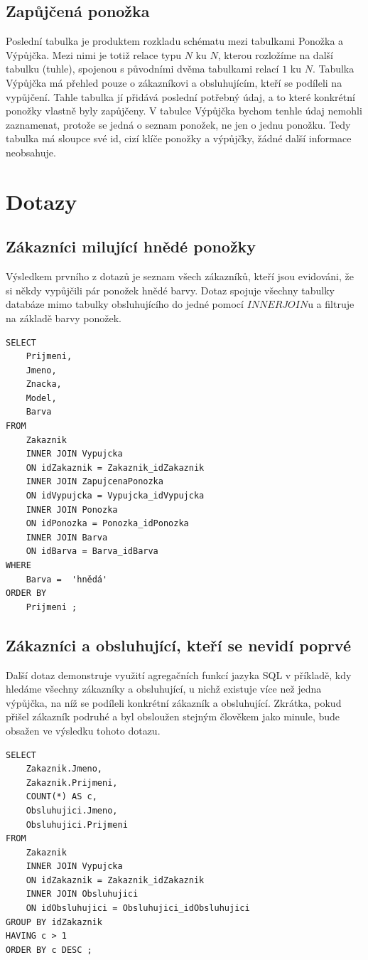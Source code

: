 \documentclass[titlepage]{article}
\begin{document}
\subsection{Zapůjčená ponožka}
Poslední tabulka je produktem rozkladu schématu mezi tabulkami Ponožka a
Výpůjčka. Mezi nimi je totiž relace typu $N$ ku $N$, kterou rozložíme na další
tabulku (tuhle), spojenou s původními dvěma tabulkami relací $1$ ku $N$.
Tabulka Výpůjčka má přehled pouze o zákazníkovi a obsluhujícím, kteří se
podíleli na vypůjčení. Tahle tabulka jí přidává poslední potřebný údaj, a to
které konkrétní ponožky vlastně byly zapůjčeny. V tabulce Výpůjčka bychom
tenhle údaj nemohli zaznamenat, protože se jedná o seznam ponožek, ne jen o
jednu ponožku. Tedy tabulka má sloupce své id, cizí klíče ponožky a výpůjčky,
žádné další informace neobsahuje.

\section{Dotazy}
\subsection{Zákazníci milující hnědé ponožky}
Výsledkem prvního z dotazů je seznam všech zákazníků, kteří jsou evidováni, že
si někdy vypůjčili pár ponožek hnědé barvy. Dotaz spojuje všechny tabulky
databáze mimo tabulky obsluhujícího do jedné pomocí $INNER JOIN$u a filtruje na
základě barvy ponožek.
\begin{verbatim}
SELECT 
	Prijmeni, 
	Jmeno, 
	Znacka, 
	Model, 
	Barva
FROM 
	Zakaznik
	INNER JOIN Vypujcka
	ON idZakaznik = Zakaznik_idZakaznik
	INNER JOIN ZapujcenaPonozka
	ON idVypujcka = Vypujcka_idVypujcka
	INNER JOIN Ponozka
	ON idPonozka = Ponozka_idPonozka
	INNER JOIN Barva
	ON idBarva = Barva_idBarva
WHERE 
	Barva =  'hnědá'
ORDER BY
	Prijmeni ;
\end{verbatim}

\subsection{Zákazníci a obsluhující, kteří se nevidí poprvé}
Další dotaz demonstruje využití agregačních funkcí jazyka SQL v příkladě, kdy
hledáme všechny zákazníky a obsluhující, u nichž existuje více než jedna
výpůjčka, na níž se podíleli konkrétní zákazník a obsluhující. Zkrátka, pokud
přišel zákazník podruhé a byl obsloužen stejným člověkem jako minule, bude
obsažen ve výsledku tohoto dotazu.
\begin{verbatim}
SELECT 
	Zakaznik.Jmeno, 
	Zakaznik.Prijmeni, 
	COUNT(*) AS c, 
	Obsluhujici.Jmeno, 
	Obsluhujici.Prijmeni 
FROM 
	Zakaznik 
	INNER JOIN Vypujcka 
	ON idZakaznik = Zakaznik_idZakaznik 
	INNER JOIN Obsluhujici 
	ON idObsluhujici = Obsluhujici_idObsluhujici 
GROUP BY idZakaznik 
HAVING c > 1
ORDER BY c DESC ;
\end{verbatim}
\end{document}
